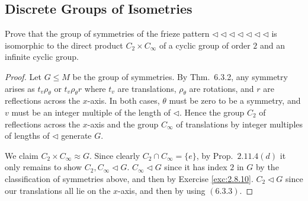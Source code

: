 \documentclass[12pt]{article}
\theoremstyle{remark}
\begin{document}
\subsection{Discrete Groups of Isometries}
\setcounter{subsubsection}{4}
\begin{problem}
  Prove that the group of symmetries of the frieze pattern $\lhd\lhd\lhd\lhd\lhd\lhd\lhd$ is isomorphic to the direct product $C_2 \times C_\infty$ of a cyclic group of order $2$ and an infinite cyclic group.
\end{problem}
\begin{proof}
  Let $G \leqslant M$ be the group of symmetries. By Thm.~6.3.2, any symmetry arises as $t_v\rho_\theta$ or $t_v\rho_\theta r$ where $t_v$ are translations, $\rho_\theta$ are rotations, and $r$ are reflections across the $x$-axis. In both cases, $\theta$ must be zero to be a symmetry, and $v$ must be an integer multiple of the length of $\lhd$. Hence the group $C_2$ of reflections across the $x$-axis and the group $C_\infty$ of translations by integer multiples of lengths of $\lhd$ generate $G$.
  \par We claim $C_2 \times C_\infty \approx G$. Since clearly $C_2 \cap C_\infty = \{e\}$, by Prop.~$2.11.4(d)$ it only remains to show $C_2,C_\infty \lhd G$. $C_\infty \lhd G$ since it has index $2$ in $G$ by the classification of symmetries above, and then by Exercise \ref{exc:2.8.10}. $C_2 \lhd G$ since our translations all lie on the $x$-axis, and then by using $(6.3.3)$.
\end{proof}
\end{document}
